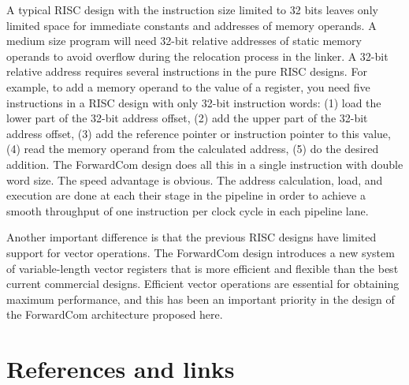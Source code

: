 \documentclass[forwardcom.tex]{subfiles}
\begin{document}
A typical RISC design with the instruction size limited to 32 bits leaves only limited space for immediate constants and addresses of memory operands. A medium size program will need 32-bit relative addresses of static memory operands to avoid overflow during the relocation process in the linker. A 32-bit relative address requires several instructions in the pure RISC designs. For example, to add a memory operand to the value of a register, you need five instructions in a RISC design with only 32-bit instruction words: (1) load the lower part of the 32-bit address offset, (2) add the upper part of the 32-bit address offset, (3) add the reference pointer or instruction pointer to this value, (4) read the memory operand from the calculated address, (5) do the desired addition. The ForwardCom design does all this in a single instruction with double word size. The speed advantage is obvious. The address calculation, load, and execution are done at each their stage in the pipeline in order to achieve a smooth throughput of one instruction per clock cycle in each pipeline lane.
\vspace{2mm}

Another important difference is that the previous RISC designs have limited support for vector operations. The ForwardCom design introduces a new system of variable-length vector registers that is more efficient and flexible than the best current commercial designs. Efficient vector operations are essential for obtaining maximum performance, and this has been an important priority in the design of the ForwardCom architecture proposed here.

\section{References and links} \label{referencesToIntroduction}
\end{document}
